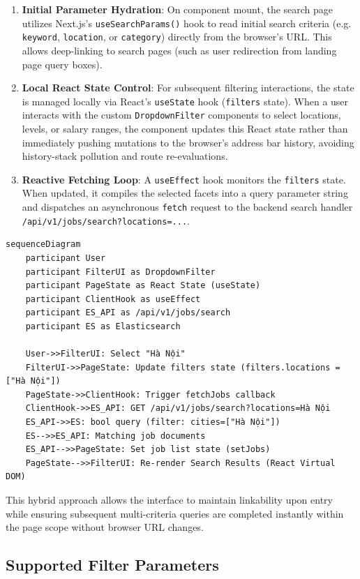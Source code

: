 \begin{enumerate}
\item \textbf{Initial Parameter Hydration}: On component mount, the search page utilizes Next.js's \texttt{useSearchParams()} hook to read initial search criteria (e.g. \texttt{keyword}, \texttt{location}, or \texttt{category}) directly from the browser's URL. This allows deep-linking to search pages (such as user redirection from landing page query boxes).
\item \textbf{Local React State Control}: For subsequent filtering interactions, the state is managed locally via React's \texttt{useState} hook (\texttt{filters} state). When a user interacts with the custom \texttt{DropdownFilter} components to select locations, levels, or salary ranges, the component updates this React state rather than immediately pushing mutations to the browser's address bar history, avoiding history-stack pollution and route re-evaluations.
\item \textbf{Reactive Fetching Loop}: A \texttt{useEffect} hook monitors the \texttt{filters} state. When updated, it compiles the selected facets into a query parameter string and dispatches an asynchronous \texttt{fetch} request to the backend search handler \texttt{/api/v1/jobs/search?locations=...}.
\end{enumerate}

\begin{verbatim}
sequenceDiagram
    participant User
    participant FilterUI as DropdownFilter
    participant PageState as React State (useState)
    participant ClientHook as useEffect
    participant ES_API as /api/v1/jobs/search
    participant ES as Elasticsearch
    
    User->>FilterUI: Select "Hà Nội"
    FilterUI->>PageState: Update filters state (filters.locations = ["Hà Nội"])
    PageState->>ClientHook: Trigger fetchJobs callback
    ClientHook->>ES_API: GET /api/v1/jobs/search?locations=Hà Nội
    ES_API->>ES: bool query (filter: cities=["Hà Nội"])
    ES-->>ES_API: Matching job documents
    ES_API-->>PageState: Set job list state (setJobs)
    PageState-->>FilterUI: Re-render Search Results (React Virtual DOM)
\end{verbatim}

This hybrid approach allows the interface to maintain linkability upon entry while ensuring subsequent multi-criteria queries are completed instantly within the page scope without browser URL changes.

\subsection{Supported Filter Parameters}

